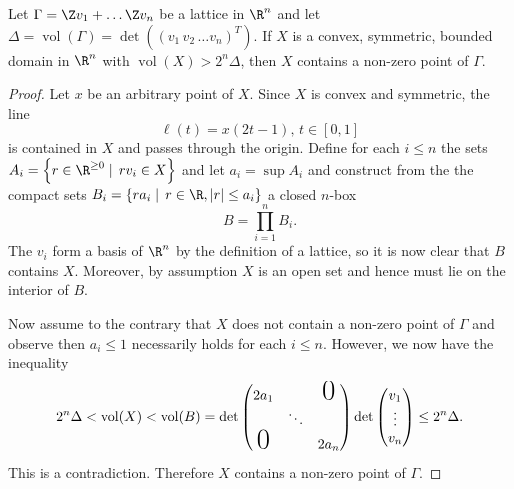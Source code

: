 \documentclass[10pt]{amsart}
\begin{document}
\begin{thm}
  \newcommand{\vol}{\operatorname{vol}}
  \label{Ex2}
  Let $\Gamma = \Z v_1 + \ldots \Z v_n$ be a lattice in $\R^n$ and let $\Delta = \vol(\Gamma) = \det((v_1\, v_2\, \ldots v_n)^{T})$.
  If $X$ is a convex, symmetric, bounded domain in $\R^n$ with $\vol(X) > 2^n\Delta$, then $X$ contains a non-zero point of $\Gamma$.

  \begin{proof}
    Let $x$ be an arbitrary point of $X$.
    Since $X$ is convex and symmetric, the line
    $$\ell(t) = x(2t - 1),\, t \in [0,1]$$
    is contained in $X$ and passes through the origin.
    Define for each $i \leq n$ the sets 
    $A_i = \left\{r \in \R^{\geq 0} \mid \, rv_i \in X\right\}$
    and let $a_i = \sup A_i$ and construct from the the compact sets
    $B_i = \left\{ra_i \mid\, r\in\R, |r| \leq a_i\right\}$
    a closed $n$-box
    $$B = \prod_{i=1}^n B_i.$$
    The $v_i$ form a basis of $\R^n$ by the definition of a lattice, so it is now clear that $B$ contains $X$.
    Moreover, by assumption $X$ is an open set and hence must lie on the interior of $B$.
    
    Now assume to the contrary that $X$ does not contain a non-zero point of $\Gamma$ and observe then $a_i \leq 1$ necessarily holds for each $i \leq n$.
    However, we now have the inequality
    $$2^n\Delta < \vol(X) < \vol(B) = \det
    \begin{pmatrix}
      2a_1 & & \text{\huge{0}}\\
      & \ddots &\\
      \text{\huge{0}} & & 2a_n
    \end{pmatrix}
    \det
    \begin{pmatrix}
      v_1\\
      \vdots\\
      v_n
    \end{pmatrix}
    \leq 2^n\Delta.
    $$
    This is a contradiction.
    Therefore $X$ contains a non-zero point of $\Gamma$.
  \end{proof}
\end{thm}
\end{document}
